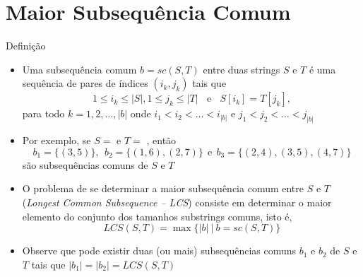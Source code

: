 \section{Maior Subsequência Comum}

\begin{frame}[fragile]{Definição}

    \begin{itemize}
        \item Uma subsequência comum $b = sc(S, T)$ entre duas strings $S$ e $T$ é uma sequência de
            pares de índices $(i_k, j_k)$ tais que 
        \[
            1\leq i_k\leq |S|, 1\leq j_k\leq |T| \ \ \ \ \mbox{e}\ \ \ \ S[i_k] = T[j_k],
        \]para todo $k = 1, 2, \ldots, |b|$ onde $i_1 < i_2 < \ldots < i_{|b|}$ e $j_1 < j_2 < \ldots < j_{|b|}$

        \item  Por exemplo, se $S = $  e $T = $ , então
        \[
            b_1 = \lbrace (3, 5)\rbrace, \ \ b_2 = \lbrace (1, 6), (2, 7)\rbrace\ \ \mbox{e}\ \ b_3 = \lbrace (2, 4), (3, 5), (4, 7)\rbrace
        \] são subsequências comuns de $S$ e $T$

        \item O problema de se determinar a maior subsequência comum entre $S$ e $T$
            (\textit{Longest Common Subsequence -- LCS}) consiste em determinar o maior
            elemento do conjunto dos tamanhos substrings comuns, isto é,
        \[
            LCS(S, T) = \max \lbrace |b|\ | \ b = sc(S, T)\rbrace
        \]

        \item Observe que pode existir duas (ou mais)
            subsequências comuns $b_1$ e $b_2$ de $S$ e $T$ tais que $|b_1| = |b_2| = LCS(S, T)$

    \end{itemize}

\end{frame}

